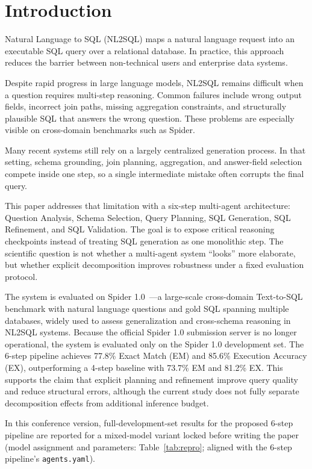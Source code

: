 

\section{Introduction}\label{sec:intro}

Natural Language to SQL (NL2SQL) maps a natural language request into an executable SQL query over a relational database. In practice, this approach reduces the barrier between non-technical users and enterprise data systems.

Despite rapid progress in large language models, NL2SQL remains difficult when a question requires multi-step reasoning. Common failures include wrong output fields, incorrect join paths, missing aggregation constraints, and structurally plausible SQL that answers the wrong question. These problems are especially visible on cross-domain benchmarks such as Spider.

Many recent systems still rely on a largely centralized generation process. In that setting, schema grounding, join planning, aggregation, and answer-field selection compete inside one step, so a single intermediate mistake often corrupts the final query.

This paper addresses that limitation with a six-step multi-agent architecture: Question Analysis, Schema Selection, Query Planning, SQL Generation, SQL Refinement, and SQL Validation. The goal is to expose critical reasoning checkpoints instead of treating SQL generation as one monolithic step. The scientific question is not whether a multi-agent system ``looks'' more elaborate, but whether explicit decomposition improves robustness under a fixed evaluation protocol.

The system is evaluated on Spider 1.0~\cite{yu2018spider}---a large-scale cross-domain Text-to-SQL benchmark with natural language questions and gold SQL spanning multiple databases, widely used to assess generalization and cross-schema reasoning in NL2SQL systems. Because the official Spider 1.0 submission server is no longer operational, the system is evaluated only on the Spider 1.0 development set. The 6-step pipeline achieves 77.8\% Exact Match (EM) and 85.6\% Execution Accuracy (EX), outperforming a 4-step baseline with 73.7\% EM and 81.2\% EX. This supports the claim that explicit planning and refinement improve query quality and reduce structural errors, although the current study does not fully separate decomposition effects from additional inference budget.

In this conference version, full-development-set results for the proposed 6-step pipeline are reported for a mixed-model variant locked before writing the paper (model assignment and parameters: Table~\ref{tab:repro}; aligned with the 6-step pipeline's \texttt{agents.yaml}).

